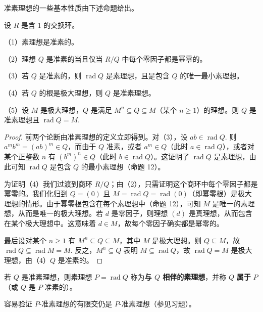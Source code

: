 准素理想的一些基本性质由下述命题给出。

\begin{proposition}\label{pro:15.19}
设 \(R\) 是含 1 的交换环。

（1）素理想是准素的。

（2）理想 \(Q\) 是准素的当且仅当 \(R/Q\) 中每个零因子都是幂零的。

（3）若 \(Q\) 是准素的，则 \(\operatorname{rad}Q\) 是素理想，且是包含 \(Q\) 的唯一最小素理想。

（4）若 \(Q\) 的根是极大理想，则 \(Q\) 是准素理想。

（5）设 \(M\) 是极大理想，\(Q\) 是满足 \(M^n \subseteq Q \subseteq M\)（某个 \(n \geq 1\)）的理想。则 \(Q\) 是准素理想且 \(\operatorname{rad}Q = M\).
\end{proposition}

\begin{proof}
前两个论断由准素理想的定义立即得到。对（3），设 \(ab \in \operatorname{rad}Q\). 则 \(a^mb^m = (ab)^m \in Q\)，而由于 \(Q\) 准素，或者 \(a^m \in Q\)（此时 \(a \in \operatorname{rad}Q\)），或者对某个正整数 \(n\) 有 \((b^m)^n \in Q\)（此时 \(b \in \operatorname{rad}Q\)）。这证明了 \(\operatorname{rad}Q\) 是素理想，由此可知 \(\operatorname{rad}Q\) 是包含 \(Q\) 的最小素理想（命题 12）。

为证明（4）我们过渡到商环 \(R/Q\)；由（2），只需证明这个商环中每个零因子都是幂零的。我们化归到 \(Q = (0)\) 且 \(M = \operatorname{rad}Q = \operatorname{rad}(0)\)（即幂零根）是极大理想的情形。由于幂零根包含在每个素理想中（命题 12），可知 \(M\) 是唯一的素理想，从而是唯一的极大理想。若 \(d\) 是零因子，则理想 \((d)\) 是真理想，从而包含在某个极大理想中。这意味着 \(d \in M\)，故每个零因子确实都是幂零的。

最后设对某个 \(n \geq 1\) 有 \(M^n \subseteq Q \subseteq M\)，其中 \(M\) 是极大理想。则 \(Q \subseteq M\)，故 \(\operatorname{rad}Q \subseteq \operatorname{rad}M = M\). 反之，\(M^n \subseteq Q\) 表明 \(M \subseteq \operatorname{rad}Q\)，故 \(\operatorname{rad}Q = M\) 是极大理想，由（4）\(Q\) 是准素的。
\end{proof}

\begin{definition}
若 \(Q\) 是准素理想，则素理想 \(P = \operatorname{rad}Q\) 称为\textbf{与 \(Q\) 相伴的素理想}，并称 \(Q\) \textbf{属于} \(P\)（或 \(Q\) 是 \(P\)-准素的）。
\end{definition}

容易验证 \(P\)-准素理想的有限交仍是 \(P\)-准素理想（参见习题）。

